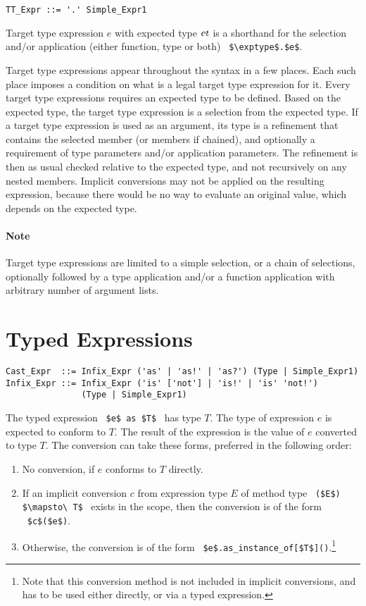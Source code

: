 \syntax\begin{lstlisting}
TT_Expr ::= '.' Simple_Expr1
\end{lstlisting}

Target type expression $e$ with expected type $\mbox{\sl et}$ is a shorthand for the selection and/or application (either function, type or both) ~\lstinline!$\exptype$.$e$!. 

Target type expressions appear throughout the syntax in a few places. Each such place imposes a condition on what is a legal target type expression for it. Every target type expressions requires an expected type to be defined. Based on the expected type, the target type expression is a selection from the expected type. If a target type expression is used as an argument, its type is a refinement that contains the selected member (or members if chained), and optionally a requirement of type parameters and/or application parameters. The refinement is then as usual checked relative to the expected type, and not recursively on any nested members. Implicit conversions may not be applied on the resulting expression, because there would be no way to evaluate an original value, which depends on the expected type. 

\paragraph{Note}
Target type expressions are limited to a simple selection, or a chain of selections, optionally followed by a type application and/or a function application with arbitrary number of argument lists. 




\section{Typed Expressions}
\label{sec:typed-expressions}

\syntax\begin{lstlisting}
Cast_Expr  ::= Infix_Expr ('as' | 'as!' | 'as?') (Type | Simple_Expr1)
Infix_Expr ::= Infix_Expr ('is' ['not'] | 'is!' | 'is' 'not!') 
               (Type | Simple_Expr1)
\end{lstlisting}

The typed expression ~\lstinline!$e$ as $T$!~ has type $T$. The type of expression $e$ is expected to conform to $T$. The result of the expression is the value of $e$ converted to type $T$. The conversion can take these forms, preferred in the following order:
\begin{enumerate}
  \item No conversion, if $e$ conforms to $T$ directly. 
  \item If an implicit conversion $c$ from expression type $E$ of method type ~\lstinline!($E$) $\mapsto\ T$!~ exists in the scope, then the conversion is of the form ~\lstinline!$c$($e$)!. 
  \item Otherwise, the conversion is of the form ~\lstinline!$e$.as_instance_of[$T$]()!.\footnote{Note that this conversion method is not included in implicit conversions, and has to be used either directly, or via a typed expression.}
\end{enumerate}


